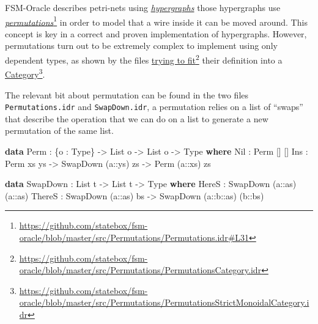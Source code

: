 \documentclass[
]{article}
\newenvironment{Shaded}{}{}
\newcommand{\DataTypeTok}[1]{\textcolor[rgb]{0.56,0.13,0.00}{#1}}
\newcommand{\KeywordTok}[1]{\textcolor[rgb]{0.00,0.44,0.13}{\textbf{#1}}}
\newcommand{\NormalTok}[1]{#1}
\newcommand{\OperatorTok}[1]{\textcolor[rgb]{0.40,0.40,0.40}{#1}}
\newcommand{\OtherTok}[1]{\textcolor[rgb]{0.00,0.44,0.13}{#1}}
\begin{document}
FSM-Oracle describes petri-nets using
\href{http://www.zanasi.com/fabio/files/paperCALCO19b.pdf}{\emph{hypergraphs}}
\cite{cartographer} those hypergraphs use
\href{https://github.com/statebox/fsm-oracle/blob/master/src/Permutations/Permutations.idr\#L31}{\emph{permutations}}\footnote{\url{https://github.com/statebox/fsm-oracle/blob/master/src/Permutations/Permutations.idr\#L31}}
in order to model that a wire inside it can be moved around. This
concept is key in a correct and proven implementation of hypergraphs.
However, permutations turn out to be extremely complex to implement
using only dependent types, as shown by the files
\href{https://github.com/statebox/fsm-oracle/blob/master/src/Permutations/PermutationsCategory.idr}{trying
to fit}\footnote{\url{https://github.com/statebox/fsm-oracle/blob/master/src/Permutations/PermutationsCategory.idr}}
their definition into a
\href{https://github.com/statebox/fsm-oracle/blob/master/src/Permutations/PermutationsStrictMonoidalCategory.idr}{Category}\footnote{\url{https://github.com/statebox/fsm-oracle/blob/master/src/Permutations/PermutationsStrictMonoidalCategory.idr}}.

The relevant bit about permutation can be found in the two files
\texttt{Permutations.idr} and \texttt{SwapDown.idr}, a permutation
relies on a list of ``swaps'' that describe the operation that we can do
on a list to generate a new permutation of the same list.

\begin{Shaded}
\begin{Highlighting}[]
\KeywordTok{data} \DataTypeTok{Perm} \OperatorTok{:}\NormalTok{ \{o }\OperatorTok{:} \DataTypeTok{Type}\NormalTok{\} }\OtherTok{{-}\textgreater{}} \DataTypeTok{List}\NormalTok{ o }\OtherTok{{-}\textgreater{}} \DataTypeTok{List}\NormalTok{ o }\OtherTok{{-}\textgreater{}} \DataTypeTok{Type} \KeywordTok{where}
  \DataTypeTok{Nil} \OperatorTok{:} \DataTypeTok{Perm}\NormalTok{ [] []}
  \DataTypeTok{Ins} \OperatorTok{:} \DataTypeTok{Perm}\NormalTok{ xs ys }\OtherTok{{-}\textgreater{}} \DataTypeTok{SwapDown}\NormalTok{ (}\OtherTok{a::}\NormalTok{ys) zs }\OtherTok{{-}\textgreater{}} \DataTypeTok{Perm}\NormalTok{ (}\OtherTok{a::}\NormalTok{xs) zs}

\KeywordTok{data} \DataTypeTok{SwapDown} \OperatorTok{:} \DataTypeTok{List}\NormalTok{ t }\OtherTok{{-}\textgreater{}} \DataTypeTok{List}\NormalTok{ t }\OtherTok{{-}\textgreater{}} \DataTypeTok{Type} \KeywordTok{where}
  \DataTypeTok{HereS}  \OperatorTok{:} \DataTypeTok{SwapDown}\NormalTok{ (}\OtherTok{a::}\NormalTok{as) (}\OtherTok{a::}\NormalTok{as)}
  \DataTypeTok{ThereS} \OperatorTok{:} \DataTypeTok{SwapDown}\NormalTok{ (}\OtherTok{a::}\NormalTok{as) bs }\OtherTok{{-}\textgreater{}} \DataTypeTok{SwapDown}\NormalTok{ (}\OtherTok{a::b::}\NormalTok{as) (}\OtherTok{b::}\NormalTok{bs)}
\end{Highlighting}
\end{Shaded}
\end{document}
